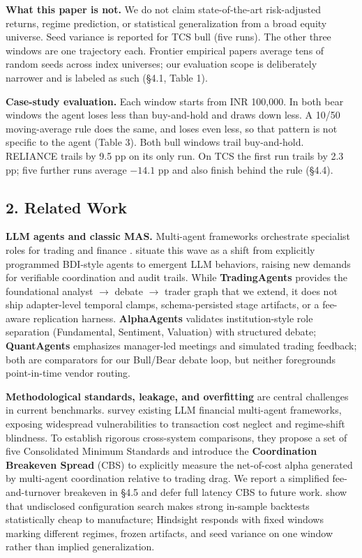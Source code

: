 \documentclass{article}
\begin{document}
\textbf{What this paper is not.} We do not claim
state-of-the-art risk-adjusted returns, regime prediction, or
statistical generalization from a broad equity universe. Seed variance
is reported for TCS bull (five runs). The other three windows are one
trajectory each. Frontier empirical papers
\citep[e.g.,][]{jeon2026blindtrade,miyazaki2026expert} average tens of random seeds across index
universes; our evaluation scope is deliberately narrower and is labeled
as such (§4.1, Table 1).

\textbf{Case-study evaluation.} Each window starts from INR 100,000.
In both bear windows the agent loses less than buy-and-hold and draws
down less. A 10/50 moving-average rule does the same, and loses even
less, so that pattern is not specific to the agent (Table 3). Both bull
windows trail buy-and-hold. RELIANCE trails by 9.5 pp on its only run.
On TCS the first run trails by 2.3 pp; five further runs average
$-14.1$ pp and also finish behind the rule (§4.4).


\subsection{2. Related Work}\label{related-work}

\textbf{LLM agents and classic MAS.} Multi-agent frameworks orchestrate
specialist roles for trading and finance
\citep{xiao2024tradingagents,yu2023finmem,yang2023fingpt}.
\citet{badica2025contemporary} situate this wave as a
shift from explicitly programmed BDI-style agents to emergent LLM
behaviors, raising new demands for verifiable coordination and audit
trails. While \textbf{TradingAgents} \citep{xiao2024tradingagents} provides the
foundational analyst $\rightarrow$ debate $\rightarrow$ trader graph that we extend, it does not
ship adapter-level temporal clamps, schema-persisted stage artifacts, or
a fee-aware replication harness. \textbf{AlphaAgents}
\citep{zhao2025alphaagents} validates institution-style role separation (Fundamental,
Sentiment, Valuation) with structured debate; \textbf{QuantAgents}
\citep{li2025quantagents} emphasizes manager-led meetings and
simulated trading feedback; both are comparators for our Bull/Bear debate
loop, but neither foregrounds point-in-time vendor routing.


\textbf{Methodological standards, leakage, and overfitting} are central challenges in current benchmarks. \citet{nguyen2026toward} survey existing LLM financial multi-agent frameworks, exposing widespread vulnerabilities to transaction cost neglect and regime-shift blindness. To establish rigorous cross-system comparisons, they propose a set of five Consolidated Minimum Standards and introduce the \textbf{Coordination Breakeven Spread} (CBS) to explicitly measure the net-of-cost alpha generated by multi-agent coordination relative to trading drag. We report a simplified fee-and-turnover breakeven in §4.5 and defer full latency CBS to future work. \citet{bailey2014pseudo} show that undisclosed configuration search makes strong in-sample backtests statistically
cheap to manufacture; Hindsight responds with fixed
windows marking different regimes, frozen artifacts, and seed variance
on one window rather than implied generalization.
\end{document}
